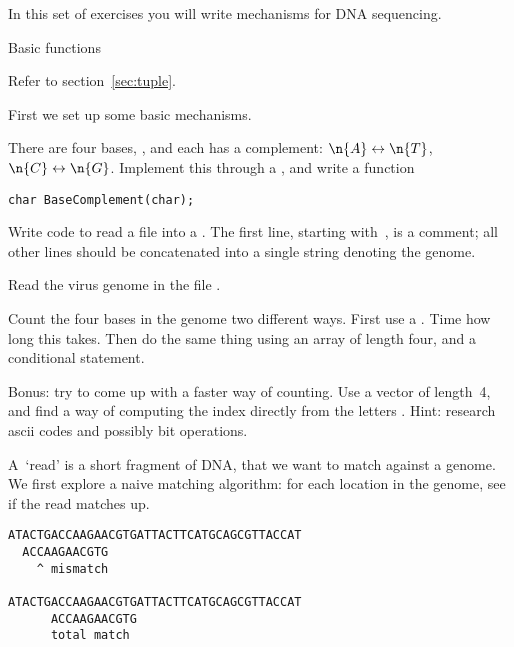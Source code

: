 
In this set of exercises you will write mechanisms for DNA sequencing.

 {Basic functions}

Refer to section~\ref{sec:tuple}.

First we set up some basic mechanisms.

\begin{exercise}
  \label{ex:basecomp}
  There are four bases, , and each has a complement:
  $\n{A}\leftrightarrow\n{T}$, $\n{C}\leftrightarrow\n{G}$.
  Implement this through a , and write a function
\begin{verbatim}
char BaseComplement(char);
\end{verbatim}
\end{exercise}

\begin{exercise}
  \label{ex:basecount}
  Write code to
  read a  file into a .
  The first line, starting with~\n{>}, is a comment; all other lines
  should be concatenated into a single string denoting the genome.
  
  Read the virus genome in the file .

  Count the four bases in the genome two different ways.  First use a
  .  Time how long this takes. Then do the same thing using an
  array of length four, and a conditional statement.

  Bonus: try to come up with a faster way of counting. Use a vector of
  length~4, and find a way of computing the index directly from the
  letters . Hint: research ascii codes and possibly bit operations.
\end{exercise}

A~`read' is a short fragment of DNA, that we want to match against a
genome. We first explore a naive matching algorithm: for each location
in the genome, see if the read matches up.
\begin{verbatim}
ATACTGACCAAGAACGTGATTACTTCATGCAGCGTTACCAT
  ACCAAGAACGTG
    ^ mismatch

ATACTGACCAAGAACGTGATTACTTCATGCAGCGTTACCAT
      ACCAAGAACGTG
      total match
\end{verbatim}

